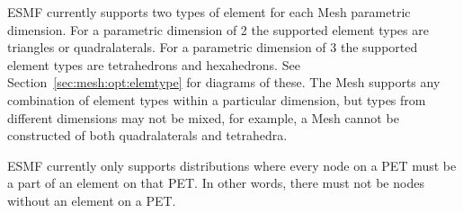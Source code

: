 ESMF currently supports two types of element for each Mesh parametric dimension. For a parametric dimension of 2 the 
supported element types are triangles or quadralaterals. For a parametric dimension of 3 the supported element types are tetrahedrons
and hexahedrons. See Section~\ref{sec:mesh:opt:elemtype} for diagrams of these. The Mesh supports any combination of element types within a particular
dimension, but types from different dimensions may not be mixed, for example, a Mesh cannot be constructed of both quadralaterals and tetrahedra.

ESMF currently only supports distributions where every node on a PET must be a part of an element on that PET. In other words, there 
must not be nodes without an element on a PET. 

